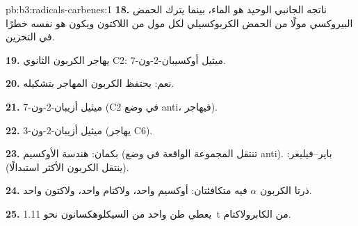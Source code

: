 \begin{solution}{pb:b3:radicals-carbenes:1}
\textbf{18.} ناتجه الجانبي الوحيد هو الماء، بينما يترك الحمض البيروكسي مولًا من
الحمض الكربوكسيلي لكل مول من اللاكتون ويكون هو نفسه خطرًا في التخزين.

\textbf{19.} يهاجر الكربون الثانوي C2: 7-ميثيل أوكسيبان-2-ون.

\textbf{20.} نعم: يحتفظ الكربون المهاجر بتشكيله.

\textbf{21.} 7-ميثيل أزيبان-2-ون (C2 في وضع anti، فيهاجر).

\textbf{22.} 3-ميثيل أزيبان-2-ون (يهاجر C6).

\textbf{23.} بكمان: هندسة الأوكسيم (تنتقل المجموعة الواقعة في وضع anti).
باير--فيليغر:  (ينتقل الكربون الأكثر استبدالًا).

\textbf{24.} ذرتا الكربون $\alpha$ فيه متكافئتان: أوكسيم واحد، ولاكتام واحد، ولاكتون واحد.

\textbf{25.} يعطي طن واحد من السيكلوهكسانون نحو \qty{1.11}{t} من الكابرولاكتام.
\end{solution}
